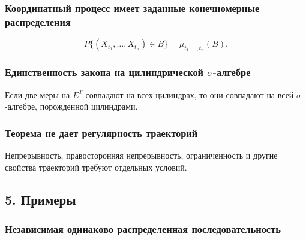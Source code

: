 \documentclass[
  11pt,
  a4paper,
]{article}
\begin{document}
\subsubsection{Координатный процесс имеет заданные конечномерные
распределения}\label{ux43aux43eux43eux440ux434ux438ux43dux430ux442ux43dux44bux439-ux43fux440ux43eux446ux435ux441ux441-ux438ux43cux435ux435ux442-ux437ux430ux434ux430ux43dux43dux44bux435-ux43aux43eux43dux435ux447ux43dux43eux43cux435ux440ux43dux44bux435-ux440ux430ux441ux43fux440ux435ux434ux435ux43bux435ux43dux438ux44f}

\[
P\{(X_{t_1},\ldots,X_{t_n})\in B\}
=
\mu_{t_1,\ldots,t_n}(B).
\]

\subsubsection{\texorpdfstring{Единственность закона на цилиндрической
\(\sigma\)-алгебре}{Единственность закона на цилиндрической \textbackslash sigma-алгебре}}\label{ux435ux434ux438ux43dux441ux442ux432ux435ux43dux43dux43eux441ux442ux44c-ux437ux430ux43aux43eux43dux430-ux43dux430-ux446ux438ux43bux438ux43dux434ux440ux438ux447ux435ux441ux43aux43eux439-sigma-ux430ux43bux433ux435ux431ux440ux435}

Если две меры на \(E^T\) совпадают на всех цилиндрах, то они совпадают
на всей \(\sigma\)-алгебре, порожденной цилиндрами.

\subsubsection{Теорема не дает регулярность
траекторий}\label{ux442ux435ux43eux440ux435ux43cux430-ux43dux435-ux434ux430ux435ux442-ux440ux435ux433ux443ux43bux44fux440ux43dux43eux441ux442ux44c-ux442ux440ux430ux435ux43aux442ux43eux440ux438ux439}

Непрерывность, правосторонняя непрерывность, ограниченность и другие
свойства траекторий требуют отдельных условий.

\subsection{5. Примеры}\label{ux43fux440ux438ux43cux435ux440ux44b}

\subsubsection{Независимая одинаково распределенная
последовательность}\label{ux43dux435ux437ux430ux432ux438ux441ux438ux43cux430ux44f-ux43eux434ux438ux43dux430ux43aux43eux432ux43e-ux440ux430ux441ux43fux440ux435ux434ux435ux43bux435ux43dux43dux430ux44f-ux43fux43eux441ux43bux435ux434ux43eux432ux430ux442ux435ux43bux44cux43dux43eux441ux442ux44c}
\end{document}
